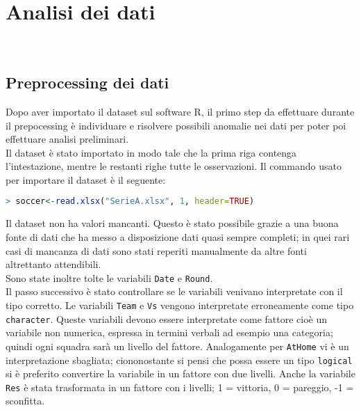 
\chapter{Analisi dei dati}
\\


\section{Preprocessing dei dati}
Dopo aver importato il dataset sul software R, il primo step da effettuare durante il prepocessing è individuare e risolvere possibili anomalie nei dati per poter poi effettuare analisi preliminari.\\
Il dataset è stato importato in modo tale che la prima riga contenga l'intestazione, mentre le restanti righe tutte le osservazioni. Il commando usato per importare il dataset è il seguente:\\

\begin{lstlisting}[language=R]
> soccer<-read.xlsx("SerieA.xlsx", 1, header=TRUE)
\end{lstlisting}
\bigskip
Il dataset non ha valori mancanti. Questo è stato possibile grazie a una buona fonte di dati che ha messo a disposizione dati quasi sempre completi; in quei rari casi di mancanza di dati sono stati reperiti manualmente da altre fonti altrettanto attendibili.\\
Sono state inoltre tolte le variabili \texttt{Date} e \texttt{Round}.\\
Il passo successivo è stato controllare se le variabili venivano interpretate con il tipo corretto. Le variabili \texttt{Team} e \texttt{Vs} vengono interpretate erroneamente come tipo \texttt{character}. Queste variabili devono essere interpretate come fattore cioè un variabile non numerica, espressa in termini verbali ad esempio una categoria; quindi ogni squadra sarà un livello del fattore. Analogamente per \texttt{AtHome} vi è un interpretazione sbagliata; ciononostante si pensi che possa essere un tipo \texttt{logical} si è preferito convertire la variabile in un fattore con due livelli. Anche la variabile \texttt{Res} è stata trasformata in un fattore con i livelli; 1 = vittoria, 0 = pareggio, -1 = sconfitta.


